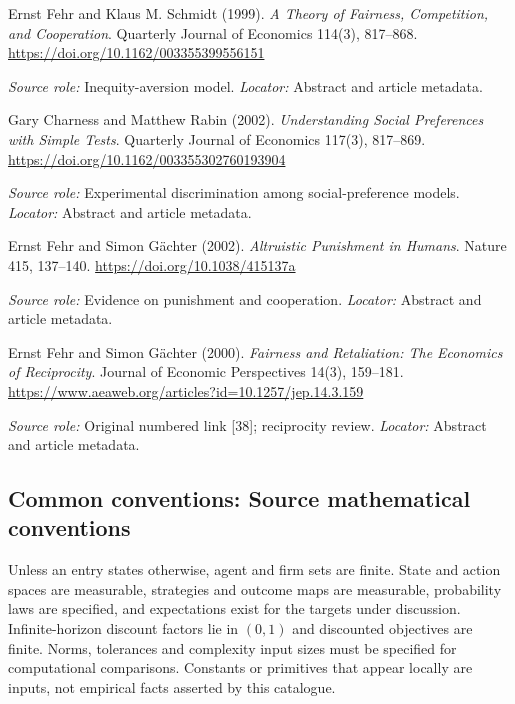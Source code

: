 \documentclass[11pt,a4paper]{article}
\begin{document}
\begin{enumerate}[label={[S\arabic*]},leftmargin=*]

\item Ernst Fehr and Klaus M. Schmidt (1999). \emph{A Theory of Fairness, Competition, and Cooperation}. Quarterly Journal of Economics 114(3), 817--868. \url{https://doi.org/10.1162/003355399556151}\par \textit{Source role:} Inequity-aversion model. \textit{Locator:} Abstract and article metadata.

\item Gary Charness and Matthew Rabin (2002). \emph{Understanding Social Preferences with Simple Tests}. Quarterly Journal of Economics 117(3), 817--869. \url{https://doi.org/10.1162/003355302760193904}\par \textit{Source role:} Experimental discrimination among social-preference models. \textit{Locator:} Abstract and article metadata.

\item Ernst Fehr and Simon Gächter (2002). \emph{Altruistic Punishment in Humans}. Nature 415, 137--140. \url{https://doi.org/10.1038/415137a}\par \textit{Source role:} Evidence on punishment and cooperation. \textit{Locator:} Abstract and article metadata.

\item Ernst Fehr and Simon Gächter (2000). \emph{Fairness and Retaliation: The Economics of Reciprocity}. Journal of Economic Perspectives 14(3), 159--181. \url{https://www.aeaweb.org/articles?id=10.1257/jep.14.3.159}\par \textit{Source role:} Original numbered link [38]; reciprocity review. \textit{Locator:} Abstract and article metadata.

\end{enumerate}

\subsection*{Common conventions: Source mathematical conventions}

Unless an entry states otherwise, agent and firm sets are finite. State and action spaces are measurable, strategies and outcome maps are measurable, probability laws are specified, and expectations exist for the targets under discussion. Infinite-horizon discount factors lie in $(0,1)$ and discounted objectives are finite. Norms, tolerances and complexity input sizes must be specified for computational comparisons. Constants or primitives that appear locally are inputs, not empirical facts asserted by this catalogue.
\end{document}
